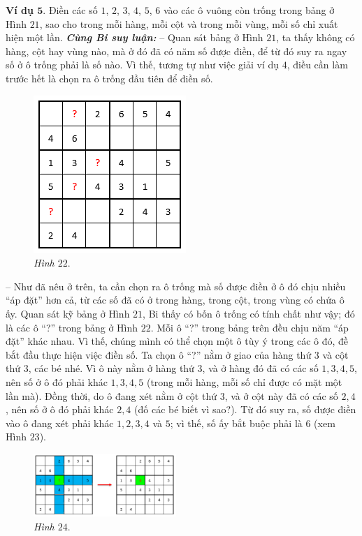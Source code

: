 	\textbf{\color{toancuabi}Ví dụ $\pmb{5.}$} Điền các số $1$, $2$, $3$, $4$, $5$, $6$ vào các ô vuông còn trống trong bảng ở Hình $21$, sao cho trong mỗi hàng, mỗi cột và trong mỗi vùng, mỗi số chỉ xuất hiện một lần.
	\vskip 0.1cm
	\textbf{\color{toancuabi}\textit{Cùng Bi suy luận:}}
	\vskip 0.05cm
	-- Quan sát bảng ở Hình $21$, ta thấy không có hàng, cột hay vùng nào, mà ở đó đã có năm số được điền, để từ đó suy ra ngay số ở ô trống phải là số nào. Vì thế, tương tự như việc giải ví dụ $4$, điều cần làm trước hết là chọn ra ô trống đầu tiên để điền số.
	\vskip 0.05cm
	\begin{figure}
		\centering
		\vspace*{-15pt}
		\captionsetup{labelformat= empty, justification=centering}
		\includegraphics[scale=0.5]{pic11}
		\vspace*{-5pt}
		\caption{\small\textit{Hình $22.$}}
		\vspace*{-15pt}
	\end{figure}
	-- Như đã nêu ở trên, ta cần chọn ra ô trống mà số được điền ở ô đó chịu nhiều “áp đặt” hơn cả, từ các số đã có ở trong hàng, trong cột, trong vùng có chứa ô ấy. Quan sát kỹ bảng ở Hình $21$, Bi thấy có bốn ô trống có tính chất như vậy; đó là các ô “?” trong bảng ở Hình $22$.
	\vskip 0.1cm
	Mỗi ô “?” trong bảng trên đều chịu năm “áp đặt” khác nhau. Vì thế, chúng mình có thể chọn một ô tùy ý trong các ô đó, đề bắt đầu thực hiện việc điền số. Ta chọn ô “?” nằm ở giao của hàng thứ $3$ và cột thứ $3$, các bé nhé. Vì ô này nằm ở hàng thứ $3$, và ở hàng đó đã có các số $1, 3, 4, 5$, nên số ở ô đó phải khác $1, 3, 4, 5$ (trong mỗi hàng, mỗi số chỉ được có mặt một lần mà). Đồng thời, do ô đang xét nằm ở cột thứ $3$, và ở cột này đã có các số $2, 4$, nên số ở ô đó phải khác $2, 4$ (đố các bé biết vì sao?). Từ đó suy ra, số được điền vào ô đang xét phải khác $1, 2, 3, 4$ và $5$; vì thế, số ấy bắt buộc phải là $6$ (xem Hình $23$).
	\begin{figure}[H]
		\centering
		\vspace*{-10pt}
		\captionsetup{labelformat= empty, justification=centering}
		\includegraphics[width=0.48\textwidth]{pic12}
		\caption{\small\textit{Hình $24.$}}
		\vspace*{-15pt}
	\end{figure}
